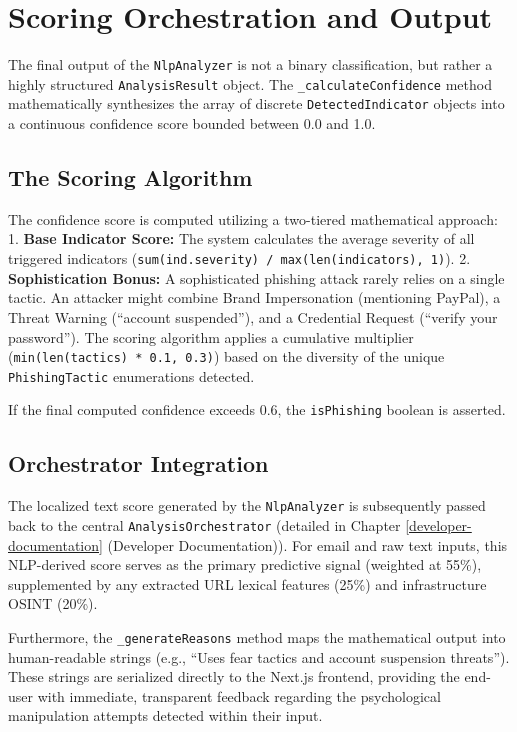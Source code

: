 \section{Scoring Orchestration and
Output}\label{scoring-orchestration-and-output}

The final output of the \texttt{NlpAnalyzer} is not a binary
classification, but rather a highly structured \texttt{AnalysisResult}
object. The \texttt{\_calculateConfidence} method mathematically
synthesizes the array of discrete \texttt{DetectedIndicator} objects
into a continuous confidence score bounded between 0.0 and 1.0.

\subsection{The Scoring Algorithm}\label{the-scoring-algorithm}

The confidence score is computed utilizing a two-tiered mathematical
approach: 1. \textbf{Base Indicator Score:} The system calculates the
average severity of all triggered indicators
(\texttt{sum(ind.severity)\ /\ max(len(indicators),\ 1)}). 2.
\textbf{Sophistication Bonus:} A sophisticated phishing attack rarely
relies on a single tactic. An attacker might combine Brand Impersonation
(mentioning PayPal), a Threat Warning (``account suspended''), and a
Credential Request (``verify your password''). The scoring algorithm
applies a cumulative multiplier
(\texttt{min(len(tactics)\ *\ 0.1,\ 0.3)}) based on the diversity of the
unique \texttt{PhishingTactic} enumerations detected.

If the final computed confidence exceeds 0.6, the \texttt{isPhishing}
boolean is asserted.

\subsection{Orchestrator
Integration}\label{orchestrator-integration}

The localized text score generated by the \texttt{NlpAnalyzer} is
subsequently passed back to the central \texttt{AnalysisOrchestrator}
(detailed in Chapter \ref{developer-documentation} (Developer Documentation)). For email and raw text inputs, this NLP-derived
score serves as the primary predictive signal (weighted at 55\%),
supplemented by any extracted URL lexical features (25\%) and
infrastructure OSINT (20\%).

Furthermore, the \texttt{\_generateReasons} method maps the mathematical
output into human-readable strings (e.g., ``Uses fear tactics and
account suspension threats''). These strings are serialized directly to
the Next.js frontend, providing the end-user with immediate, transparent
feedback regarding the psychological manipulation attempts detected
within their input.

